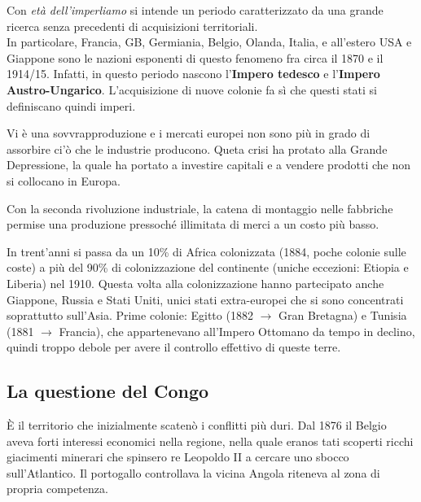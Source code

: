 \documentclass[a4paper]{article}
\begin{document}
Con \textit{età dell'imperliamo} si intende un periodo
caratterizzato da una grande ricerca senza precedenti di acquisizioni territoriali. \\
In particolare, Francia, GB, Germiania, Belgio, Olanda, Italia, e all'estero
USA e Giappone sono le nazioni esponenti di questo fenomeno
fra circa il 1870 e il 1914/15.
Infatti, in questo periodo nascono l'\textbf{Impero tedesco} e l'\textbf{Impero Austro-Ungarico}.
L'acquisizione di nuove colonie fa sì che questi stati si definiscano quindi imperi.

Vi è una sovvrapproduzione e i mercati europei non sono più in grado di assorbire ci'ò che le industrie producono.
Queta crisi ha protato alla Grande Depressione, la quale ha portato a investire capitali 
e a vendere prodotti che non si collocano in Europa.

Con la seconda rivoluzione industriale, la catena di montaggio nelle fabbriche
permise una produzione pressoché illimitata di merci a un costo più basso.

In trent'anni si passa da un 10\% di Africa colonizzata (1884, poche colonie sulle coste) a più del 90\% di
colonizzazione del continente (uniche eccezioni: Etiopia e Liberia) nel 1910.
Questa volta alla colonizzazione hanno partecipato anche Giappone, Russia e Stati Uniti, unici stati
extra-europei che si sono concentrati soprattutto sull'Asia.
Prime colonie: Egitto (1882 \(\rightarrow\) Gran Bretagna) e Tunisia (1881 \(\rightarrow\) Francia), che appartenevano
all'Impero Ottomano da tempo in declino, quindi troppo debole per avere il controllo effettivo di
queste terre.


\subsection{La questione del Congo}

È il territorio che inizialmente scatenò i conflitti più duri.
Dal 1876 il Belgio aveva forti interessi economici nella regione, nella quale
eranos tati scoperti ricchi giacimenti minerari che spinsero re Leopoldo II a cercare
uno sbocco sull'Atlantico. Il portogallo controllava la vicina Angola riteneva al zona di propria competenza.
\end{document}
